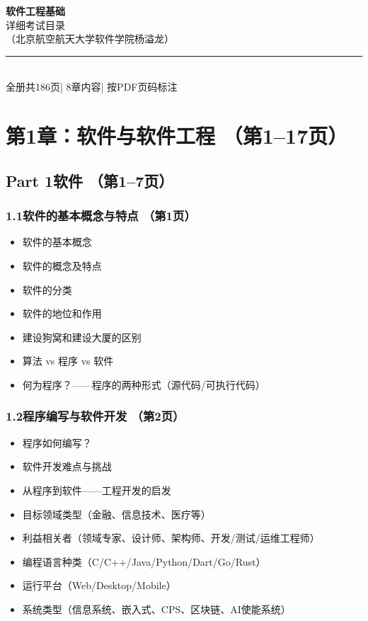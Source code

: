 \documentclass[12pt,a4paper]{ctexart}
\begin{document}
\begin{center}
    {\Huge\bfseries 软件工程基础}\\[0.5cm]
    {\Large 详细考试目录}\\[0.3cm]
    {\normalsize （北京航空航天大学软件学院\quad 杨溢龙）}\\[0.5cm]
    \rule{\textwidth}{1pt}\\[0.5cm]
    {\normalsize 全册共186页\quad | \quad 8章内容\quad | \quad 按PDF页码标注}
\end{center}

\vspace{0.5cm}

\section{第1章：软件与软件工程 \hfill（第1--17页）}

\subsection{Part 1\quad 软件 \hfill（第1--7页）}

\subsubsection{1.1\quad 软件的基本概念与特点 \hfill（第1页）}
\begin{itemize}
    \item 软件的基本概念
    \item 软件的概念及特点
    \item 软件的分类
    \item 软件的地位和作用
    \item 建设狗窝和建设大厦的区别
    \item 算法 vs 程序 vs 软件
    \item 何为程序？——程序的两种形式（源代码/可执行代码）
\end{itemize}

\subsubsection{1.2\quad 程序编写与软件开发 \hfill（第2页）}
\begin{itemize}
    \item 程序如何编写？
    \item 软件开发难点与挑战
    \item 从程序到软件——工程开发的启发
    \item 目标领域类型（金融、信息技术、医疗等）
    \item 利益相关者（领域专家、设计师、架构师、开发/测试/运维工程师）
    \item 编程语言种类（C/C++/Java/Python/Dart/Go/Rust）
    \item 运行平台（Web/Desktop/Mobile）
    \item 系统类型（信息系统、嵌入式、CPS、区块链、AI使能系统）
\end{itemize}
\end{document}
